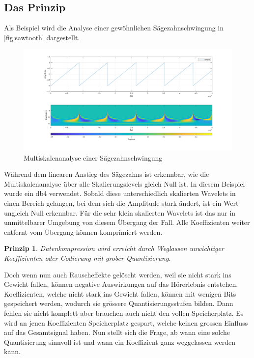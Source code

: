 \begin{refsection}
\subsection{Das Prinzip}
Als Beispiel wird die Analyse einer gewöhnlichen Sägezahnschwingung in \autoref{fig:sawtooth} dargestellt.
\begin{figure}
	\centering
	\includegraphics[width=\linewidth]{papers/compress/Bilder/sawtooth}
	\caption{Multiskalenanalyse einer Sägezahnschwingung}
	\label{fig:sawtooth}
\end{figure}
Während dem linearen Anstieg des Sägezahns ist erkennbar, wie die Multiskalenanalyse über alle Skalierungslevels gleich Null ist.
In diesem Beispiel wurde ein db4 verwendet.
Sobald diese unterschiedlich skalierten Wavelets in einen Bereich gelangen, bei dem sich die Amplitude stark ändert, ist ein Wert ungleich Null erkennbar.
Für die sehr klein skalierten Wavelets ist das nur in unmittelbarer Umgebung von diesem Übergang der Fall.
Alle Koeffizienten weiter entfernt vom Übergang können komprimiert werden.

\newtheorem{Prinzip}{Prinzip}
\begin{Prinzip}
	Datenkompression wird erreicht durch Weglassen unwichtiger Koeffizienten oder Codierung mit grober Quantisierung.
\end{Prinzip}

Doch wenn nun auch Rauscheffekte gelöscht werden, weil sie nicht stark ins Gewicht fallen, können negative Auswirkungen auf das Hörerlebnis entstehen. 
Koeffizienten, welche nicht stark ins Gewicht fallen, können mit wenigen Bits gespeichert werden, wodurch sie grössere Quantisierungsstufen bilden. 
Dann fehlen sie nicht komplett aber brauchen auch nicht den vollen Speicherplatz.
Es wird an jenen Koeffizienten Speicherplatz gespart, welche keinen grossen Einfluss auf das Gesamtsignal haben.
Nun stellt sich die Frage, ab wann eine solche Quantisierung sinnvoll ist und wann ein Koeffizient ganz weggelassen werden kann.


\end{refsection}
